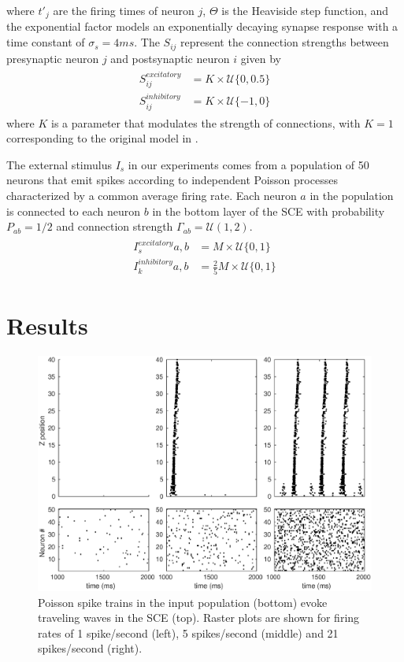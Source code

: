 \documentclass[12pt]{article}
\begin{document}
where $t'_j$ are the firing times of neuron $j$, $\Theta$ is the Heaviside step function, and the exponential factor models an exponentially decaying synapse response with a time constant of $\sigma_s = 4 ms$. 
The $S_{ij}$ represent the connection strengths between presynaptic neuron $j$ and postsynaptic neuron $i$ given by
\begin{align}
 \begin{split}
  S_{ij}^{excitatory} &= K \times \mathcal{U}\{0,0.5 \} \\
  S_{ij}^{inhibitory} &= K \times \mathcal{U}\{-1,0 \} 
 \end{split}
\end{align}
where $K$ is a parameter that modulates the strength of connections, with $K=1$ corresponding to the original model in \parencite{izhikevich2003}. 

The external stimulus $I_s$ in our experiments comes from a population of 50 neurons that emit spikes according to independent Poisson processes characterized by a common average firing rate.
Each neuron $a$ in the population is connected to each neuron $b$ in the bottom layer of the SCE with probability $P_{ab} = 1/2$ and connection strength $\Gamma_{ab}=\mathcal{U}(1,2)$.
\begin{align}\label{eq:populationstim}
 \begin{split}
  I_s^{excitatory} {a,b}&= M \times \mathcal{U}\{0,1 \} \\
  I_k^{inhibitory} {a,b} &= \frac{2}{5} M \times \mathcal{U}\{0,1 \}
 \end{split}
\end{align}

\FloatBarrier

\section{Results}

\begin{figure}[!htb]
 \centering
 \includegraphics[width=\textwidth]{fig/SCE_2x2_FRE_rasters}
 \caption{Poisson spike trains in the input population (bottom) evoke traveling waves in the SCE (top). Raster plots are shown for firing rates of 1 spike/second (left), 5 spikes/second (middle) and 21 spikes/second (right).  }
 \label{fig:sce_raster}
\end{figure}
\end{document}
